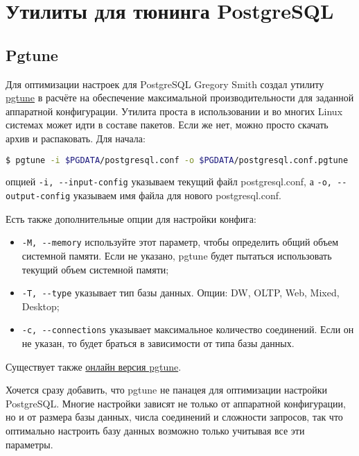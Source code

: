 \section{Утилиты для тюнинга PostgreSQL}

\subsection{Pgtune}

Для оптимизации настроек для PostgreSQL Gregory Smith создал утилиту \href{http://pgtune.projects.postgresql.org/}{pgtune} в расчёте на обеспечение максимальной производительности для заданной аппаратной конфигурации. Утилита проста в использовании и во многих Linux системах может идти в составе пакетов. Если же нет, можно просто скачать архив и распаковать. Для начала:

\begin{lstlisting}[language=Bash,label=lst:pgtune_settings1,caption=Pgtune]
$ pgtune -i $PGDATA/postgresql.conf -o $PGDATA/postgresql.conf.pgtune
\end{lstlisting}

опцией \lstinline!-i, --input-config! указываем текущий файл postgresql.conf, а \lstinline!-o, --output-config! указываем имя файла для нового postgresql.conf.

Есть также дополнительные опции для настройки конфига:

\begin{itemize}
  \item \lstinline!-M, --memory! используйте этот параметр, чтобы определить общий объем системной памяти. Если не указано, pgtune будет пытаться использовать текущий объем системной памяти;
  \item \lstinline!-T, --type! указывает тип базы данных. Опции: DW,  OLTP,  Web, Mixed, Desktop;
  \item \lstinline!-c, --connections! указывает максимальное количество соединений. Если он не указан, то будет браться в зависимости от типа базы данных.
\end{itemize}

Существует также \href{http://pgtune.leopard.in.ua/}{онлайн версия pgtune}.

Хочется сразу добавить, что pgtune не панацея для оптимизации настройки PostgreSQL. Многие настройки зависят не только от аппаратной конфигурации, но и от размера базы данных, числа соединений и сложности запросов, так что оптимально настроить базу данных возможно только учитывая все эти параметры.


